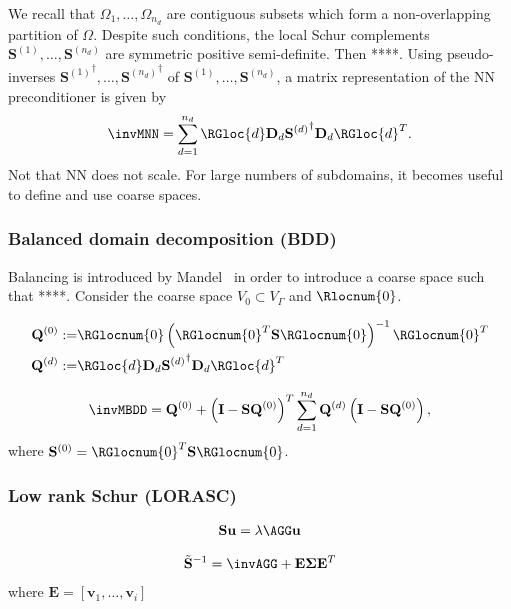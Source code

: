 \documentclass{article}
\begin{document}
We recall that $\Omega_1,\dots,\Omega_{n_d}$ are contiguous subsets which form a non-overlapping partition of $\Omega$.
Despite such conditions, the local Schur complements $\mathbf{S}^{(1)},\dots,\mathbf{S}^{(n_d)}$ are symmetric positive semi-definite.
Then ****.
Using pseudo-inverses ${\mathbf{S}^{(1)}}^\dagger,\dots,{\mathbf{S}^{(n_d)}}^\dagger$ of $\mathbf{S}^{(1)},\dots,\mathbf{S}^{(n_d)}$, a matrix representation of the NN preconditioner is given by
\begin{align}
\invMNN=\sum_{d=1}^{n_d}
\RGloc{d}
\mathbf{D}_d
{\mathbf{S}^{(d)}}^\dagger
\mathbf{D}_d
\RGloc{d}^T.
\end{align}
Not that NN does not scale.
For large numbers of subdomains, it becomes useful to define and use coarse spaces.

\subsubsection{Balanced domain decomposition (BDD)}
Balancing is introduced by Mandel~\cite{Mandel1993} in order to introduce a coarse space such that ****.
Consider the coarse space $V_0\subset V_\Gamma$ and $\Rlocnum{0}$.

\begin{align}
\mathbf{Q}^{(0)}:=&\RGlocnum{0}\left(\RGlocnum{0}^T\mathbf{S}\RGlocnum{0}\right)^{-1}\RGlocnum{0}^T\\
\mathbf{Q}^{(d)}:=&\RGloc{d}\mathbf{D}_d{\mathbf{S}^{(d)}}^\dagger\mathbf{D}_d\RGloc{d}^T
\end{align}


\begin{align}
\invMBDD=
{\mathbf{Q}^{(0)}}
+
\left(\mathbf{I}-\mathbf{S}\mathbf{Q}^{(0)}\right)^T
\sum_{d=1}^{n_d}
\mathbf{Q}^{(d)}
\left(\mathbf{I}-\mathbf{S}\mathbf{Q}^{(0)}\right),
\end{align}
where $\mathbf{S}^{(0)}=\RGlocnum{0}^T\mathbf{S}\RGlocnum{0}$.


\subsubsection{Low rank Schur (LORASC)}

\begin{align}
\mathbf{S}\mathbf{u}=\lambda\AGG\mathbf{u}
\end{align}

\begin{align}
\tilde{\mathbf{S}}^{-1}=\invAGG+\mathbf{E}\boldsymbol{\Sigma}\mathbf{E}^T
\end{align}
where $\mathbf{E}=[\mathbf{v}_1,\dots,\mathbf{v}_i]$
\end{document}
